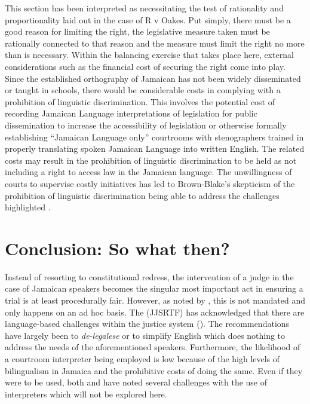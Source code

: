 \documentclass[output=paper,colorlinks,citecolor=brown]{langscibook}
\begin{document}
This section has been interpreted as necessitating the test of rationality and proportionality laid out in the case of R v Oakes. Put simply, there must be a good reason for limiting the right, the legislative measure taken must be rationally connected to that reason and the measure must limit the right no more than is necessary. Within the balancing exercise that takes place here, external considerations such as the financial cost of securing the right come into play. Since the established orthography of Jamaican has not been widely disseminated or taught in schools, there would be considerable costs in complying with a prohibition of linguistic discrimination. This involves the potential cost of recording Jamaican Language interpretations of legislation for public dissemination to increase the accessibility of legislation or otherwise formally establishing “Jamaican Language only” courtrooms with stenographers trained in properly translating spoken Jamaican Language into written English. The related costs may result in the prohibition of linguistic discrimination to be held as not including a right to access law in the Jamaican language. The unwillingness of courts to supervise costly initiatives has led to Brown-Blake’s skepticism of the prohibition of linguistic discrimination being able to address the challenges highlighted \citep{BrownBlake2008}.


\section{Conclusion: So what then?}

Instead of resorting to constitutional redress, the intervention of a judge in the case of Jamaican speakers becomes the singular most important act in ensuring a trial is at least procedurally fair. However, as noted by \citet{BrownBlake2017}, this is not mandated and only happens on an ad hoc basis. The \citeauthor{JamaicanJusticeSystemReformTaskForce2007} (JJSRTF) has acknowledged that there are language-based challenges within the justice system (\citeyear{JamaicanJusticeSystemReformTaskForce2007}). The recommendations have largely been to \textit{de-legalese} or to simplify English which does nothing to address the needs of the aforementioned speakers. Furthermore, the likelihood of a courtroom interpreter being employed is low because of the high levels of bilingualism in Jamaica and the prohibitive costs of doing the same. Even if they were to be used, both \citet{Eades2003} and \citet{Ng2009} have noted several challenges with the use of interpreters which will not be explored here.
\end{document}
